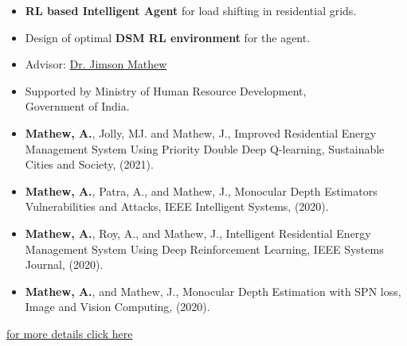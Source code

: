 \documentclass[10pt,a4paper,ragged2e, normalphoto]{altacv}
\begin{document}
\divider


\begin{itemize}
	\item \textbf{RL based Intelligent Agent} for load shifting in residential grids.
	\item Design of optimal \textbf{DSM RL environment} for the agent.
	\item Advisor: \href{https://dblp.org/pid/93/1946.html}{{\color{IFLightBlue}Dr. Jimson Mathew}}
	\item Supported by Ministry of Human Resource Development,\\ Government of India.
\end{itemize}



\begin{itemize}
	\item {\color{IFLightBlue} \textbf{Mathew, A.}}, Jolly, MJ. and Mathew, J., Improved Residential Energy Management System Using Priority Double Deep Q-learning, Sustainable Cities and Society, (2021).
	\item {\color{IFLightBlue} \textbf{Mathew, A.}}, Patra, A., and Mathew, J., Monocular Depth Estimators Vulnerabilities and Attacks, IEEE Intelligent Systems, (2020).
	\item {\color{IFLightBlue} \textbf{Mathew, A.}}, Roy, A., and Mathew, J., Intelligent Residential Energy Management System Using Deep Reinforcement Learning, IEEE Systems Journal, (2020).
	\item {\color{IFLightBlue} \textbf{Mathew, A.}}, and Mathew, J., Monocular Depth Estimation with SPN loss, Image and Vision Computing, (2020).
\end{itemize}

\hfill \href{https://alwynm.github.io/pub}{for more details {\color{IFLightBlue}click here}}
\end{document}
